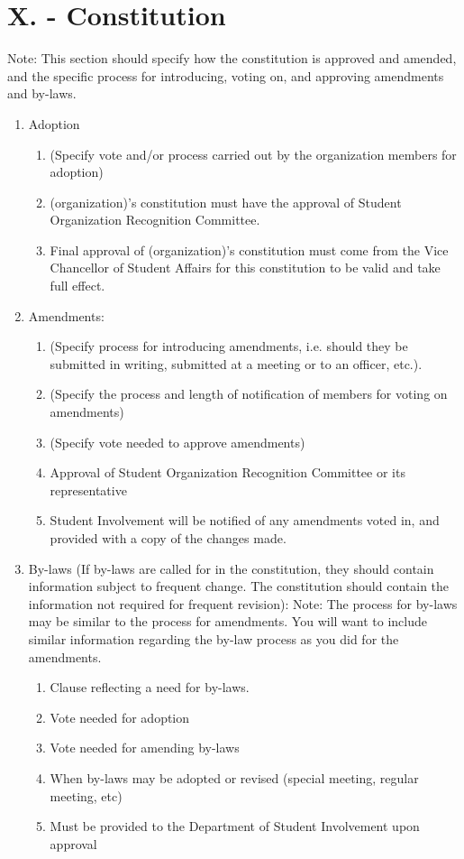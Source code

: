 \documentclass[11pt,a4paper,notitlepage]{article}
\begin{document}
\section*{X. - Constitution}
Note:  This section should specify how the constitution is approved and amended,
and the specific process for introducing, voting on, and approving amendments
and by-laws.
\begin{enumerate}
  \item Adoption
    \begin{enumerate}
      \item	(Specify vote and/or process carried out by the organization members
      for adoption)
      \item	(organization)’s constitution must have the approval of Student
      Organization Recognition Committee.
      \item	Final approval of (organization)’s constitution must come from the
      Vice Chancellor of Student Affairs for this constitution to be valid and
      take full effect.
    \end{enumerate}
  \item	Amendments:
    \begin{enumerate}
      \item	(Specify process for introducing amendments, i.e. should they be
      submitted in writing, submitted at a meeting or to an officer, etc.).
      \item	(Specify the process and length of notification of members for
      voting on amendments)
      \item	(Specify vote needed to approve amendments)
      \item	Approval of Student Organization Recognition Committee or its
      representative
      \item	Student Involvement will be notified of any amendments voted in, and
      provided with a copy of the changes made.
    \end{enumerate}
  \item	By-laws (If by-laws are called for in the constitution, they should
contain information subject to frequent change.  The constitution should contain
the information not required for frequent revision): Note:  The process for
by-laws may be similar to the process for amendments.  You will want to include
similar information regarding the by-law process as you did for the amendments.
    \begin{enumerate}
      \item	Clause reflecting a need for by-laws.
      \item	Vote needed for adoption
      \item	Vote needed for amending by-laws
      \item	When by-laws may be adopted or revised (special meeting, regular
      meeting, etc)
      \item	Must be provided to the Department of Student Involvement upon
      approval
    \end{enumerate}
\end{enumerate}
\end{document}
